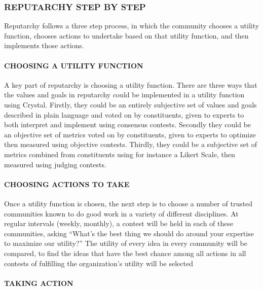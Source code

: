 \subsubsection{\texorpdfstring{\protect\hypertarget{_hnrexbnydcwo}{}{\protect\hypertarget{_Toc462050421}{}{}}REPUTARCHY
STEP BY STEP}{REPUTARCHY STEP BY STEP}}\label{reputarchy-step-by-step}

Reputarchy follows a three step process, in which the community chooses
a utility function, chooses actions to undertake based on that utility
function, and then implements those actions.

\paragraph{CHOOSING A UTILITY
FUNCTION}\label{choosing-a-utility-function}

A key part of reputarchy is choosing a utility function. There are three
ways that the values and goals in reputarchy could be implemented in a
utility function using Crystal. Firstly, they could be an entirely
subjective set of values and goals described in plain language and voted
on by constituents, given to experts to both interpret and implement
using consensus contests. Secondly they could be an objective set of
metrics voted on by constituents, given to experts to optimize then
measured using objective contests. Thirdly, they could be a subjective
set of metrics combined from constituents using for instance a Likert
Scale, then measured using judging contests.

\paragraph{CHOOSING ACTIONS TO TAKE}\label{choosing-actions-to-take}

Once a utility function is chosen, the next step is to choose a number
of trusted communities known to do good work in a variety of different
disciplines. At regular intervals (weekly, monthly), a contest will be
held in each of these communities, asking ``What's the best thing we
should do around your expertise to maximize our utility?'' The utility
of every idea in every community will be compared, to find the ideas
that have the best chance among all actions in all contests of
fulfilling the organization's utility will be selected

\paragraph{TAKING ACTION }\label{taking-action}

